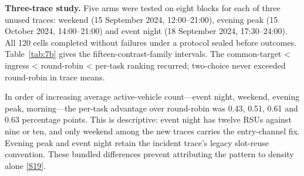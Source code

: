 \documentclass[12pt,a4paper]{article}
\begin{document}
\textbf{Three-trace study.} Five arms were tested on eight blocks for each of three unused traces: weekend (15 September 2024, 12:00--21:00), evening peak (15 October 2024, 14:00--21:00) and event night (18 September 2024, 17:30--24:00). All 120 cells completed without failures under a protocol sealed before outcomes. Table~\ref{tab:7b} gives the fifteen-contrast-family intervals. The common-target < ingress < round-robin < per-task ranking recurred; two-choice never exceeded round-robin in trace means.

In order of increasing average active-vehicle count---event night, weekend, evening peak, morning---the per-task advantage over round-robin was 0.43, 0.51, 0.61 and 0.63 percentage points. This is descriptive: event night has twelve RSUs against nine or ten, and only weekend among the new traces carries the entry-channel fix. Evening peak and event night retain the incident trace's legacy slot-reuse convention. These bundled differences prevent attributing the pattern to density alone \hyperref[source-s19]{[S19]}.
\end{document}
